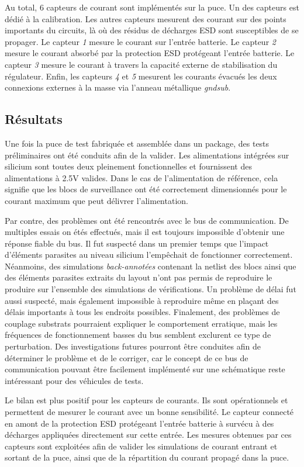 Au total, 6 capteurs de courant sont implémentés sur la puce.
Un des capteurs est dédié à la calibration.
Les autres capteurs mesurent des courant sur des points importants du circuits, là où des résidus de décharges ESD sont susceptibles de se propager.
Le capteur \textit{1} mesure le courant sur l'entrée batterie.
Le capteur \textit{2} mesure le courant absorbé par la protection ESD protégeant l'entrée batterie.
Le capteur \textit{3} mesure le courant à travers la capacité externe de stabilisation du régulateur.
Enfin, les capteurs \textit{4} et \textit{5} mesurent les courants évacués les deux connexions externes à la masse via l'anneau métallique \textit{gndsub}.

\subsection{Résultats}

Une fois la puce de test fabriquée et assemblée dans un package, des tests préliminaires ont été conduits afin de la valider.
Les alimentations intégrées sur silicium sont toutes deux pleinement fonctionnelles et fournissent des alimentations à 2.5V valides.
Dans le cas de l'alimentation de référence, cela signifie que les blocs de surveillance ont été correctement dimensionnés pour le courant maximum que peut délivrer l'alimentation.

Par contre, des problèmes ont été rencontrés avec le bus de communication.
De multiples essais on étés effectués, mais il est toujours impossible d'obtenir une réponse fiable du bus.
Il fut suspecté dans un premier temps que l'impact d'éléments parasites au niveau silicium l'empêchait de fonctionner correctement.
Néanmoins, des simulations \textit{back-annotées} contenant la netlist des blocs ainsi que des éléments parasites extraits du layout n'ont pas permis de reproduire le produire sur l'ensemble des simulations de vérifications.
Un problème de délai fut aussi suspecté, mais également impossible à reproduire même en plaçant des délais importants à tous les endroits possibles.
Finalement, des problèmes de couplage substrats pourraient expliquer le comportement erratique, mais les fréquences de fonctionnement basses du bus semblent exclurent ce type de perturbation.
Des investigations futures pourront être conduites afin de déterminer le problème et de le corriger, car le concept de ce bus de communication pouvant être facilement implémenté sur une schématique reste intéressant pour des véhicules de tests.

Le bilan est plus positif pour les capteurs de courants.
Ils sont opérationnels et permettent de mesurer le courant avec un bonne sensibilité.
Le capteur connecté en amont de la protection ESD protégeant l'entrée batterie à survécu à des décharges appliquées directement sur cette entrée.
Les mesures obtenues par ces capteurs sont exploitées afin de valider les simulations de courant entrant et sortant de la puce, ainsi que de la répartition du courant propagé dans la puce.
